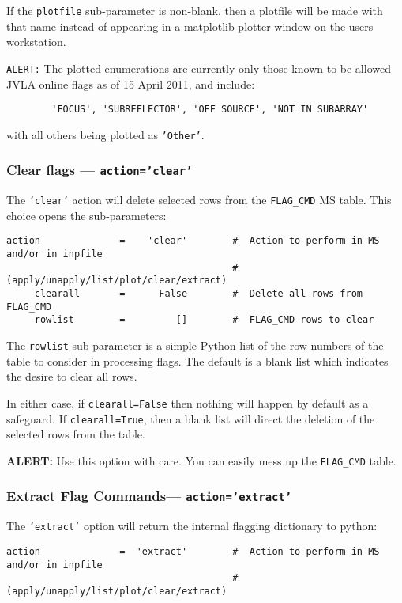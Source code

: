 If the {\tt plotfile} sub-parameter is non-blank, then a plotfile will
be made with that name instead of appearing in a matplotlib plotter window
on the users workstation.

{\tt ALERT:} The plotted enumerations are currently only those known
to be allowed JVLA online flags as of 15 April 2011, and include:
\begin{verbatim}
        'FOCUS', 'SUBREFLECTOR', 'OFF SOURCE', 'NOT IN SUBARRAY'
\end{verbatim}
with all others being plotted as {\tt 'Other'}.

\subsubsection{Clear flags --- {\tt action='clear'}}
\label{section:edit.flagcmd.action.clear}

The {\tt 'clear'} action will delete selected rows from the 
{\tt FLAG\_CMD} MS table.
This choice opens the sub-parameters:
\small
\begin{verbatim}
action              =    'clear'        #  Action to perform in MS and/or in inpfile
                                        #   (apply/unapply/list/plot/clear/extract)
     clearall       =      False        #  Delete all rows from FLAG_CMD
     rowlist        =         []        #  FLAG_CMD rows to clear
\end{verbatim}
\normalsize

The {\tt rowlist} sub-parameter is a simple Python list of the row
numbers of the table to consider in processing flags.  The default is
a blank list which indicates the desire to clear all rows.

In either case, if {\tt clearall=False} then nothing will
happen by default as a safeguard.  If {\tt clearall=True}, then a 
blank list will direct the deletion of the selected rows from the table.

{\bf ALERT:} Use this option with care.  You can easily mess up the
{\tt FLAG\_CMD} table.

\subsubsection{Extract Flag Commands--- {\tt action='extract'}}
\label{section:edit.flagcmd.action.extract}

The {\tt 'extract'} option will return the internal flagging dictionary to
              python:
\small
\begin{verbatim}
action              =  'extract'        #  Action to perform in MS and/or in inpfile
                                        #   (apply/unapply/list/plot/clear/extract)
\end{verbatim}
\normalsize

